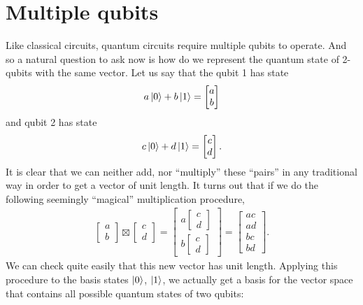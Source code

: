 \documentclass[a4paper,11pt]{article}
\numberwithin{equation}{section}
\theoremstyle{definition}
\begin{document}
\section{Multiple qubits}
Like classical circuits, quantum circuits require multiple qubits to operate. And so a natural question to ask now is how do we represent the quantum state of 2-qubits with the same vector. Let us say that the qubit 1 has state $$a\left\vert{0}\right\rangle + b\left\vert{1}\right\rangle = \begin{bmatrix}
a\\b
\end{bmatrix}$$ and qubit 2 has state $$c\left\vert{0}\right\rangle + d\left\vert{1}\right\rangle = \begin{bmatrix}
c\\d
\end{bmatrix}.$$ It is clear that we can neither add, nor ``multiply'' these ``pairs'' in any traditional way in order to get a vector of unit length. It turns out that if we do the following seemingly ``magical'' multiplication procedure,
\begin{align*}
\begin{bmatrix}
a\\b
\end{bmatrix}
\boxtimes
\begin{bmatrix}
c\\d
\end{bmatrix} = \begin{bmatrix}
a\begin{bmatrix}
c\\d
\end{bmatrix}\\
b\begin{bmatrix}
c\\d
\end{bmatrix}
\end{bmatrix}
=
\begin{bmatrix}
ac\\ad\\bc\\bd
\end{bmatrix}.
\end{align*}
We can check quite easily that this new vector has unit length. Applying this procedure to the basis states $\left\vert{0}\right\rangle$, $\left\vert{1}\right\rangle$, we actually get a basis for the vector space that contains all possible quantum states of two qubits:
\end{document}
